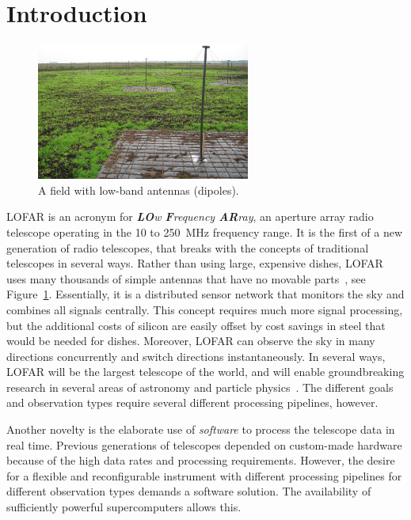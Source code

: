 \documentclass{sig-alternate}
\begin{document}
\section{Introduction}

\begin{figure}[ht]
\begin{center}
\includegraphics[width=70mm]{LBA-field.jpg}
\end{center}
\caption{A field with low-band antennas (dipoles).}
\label{fig:lba-field}
\end{figure}

LOFAR is an acronym for \emph{\textbf{LO}w \textbf{F}requency \textbf{AR}ray},
an aperture array radio telescope operating in the 10 to 250~MHz frequency
range.
It is the first of a new generation of radio telescopes, that breaks with
the concepts of traditional telescopes in several ways.
Rather than using large, expensive dishes, LOFAR uses many thousands of
simple antennas that have no movable parts~\cite{Butcher:04,deVos:09}, see Figure~\ref{fig:lba-field}.
Essentially, it is a distributed sensor network that monitors the sky
and combines all signals centrally.
This concept requires much more signal processing, but the additional costs
of silicon are easily offset by cost savings in steel that would be needed for dishes.
Moreover, LOFAR can observe the sky in many directions concurrently and
switch directions instantaneously. 
In several ways, LOFAR will be the largest telescope of the world, 
and will enable groundbreaking research in several areas of astronomy and particle
physics~\cite{Bruyn:02}. The different goals and observation types require
several different processing pipelines, however.

Another novelty is the elaborate use of \emph{software\/} to process
the telescope data in real time.
Previous generations of telescopes depended on custom-made hardware
because of the high data rates and processing requirements.
However, the desire for a flexible and reconfigurable instrument with
different processing pipelines for different observation types demands a
software solution.
The availability of sufficiently powerful supercomputers allows this.
\end{document}
